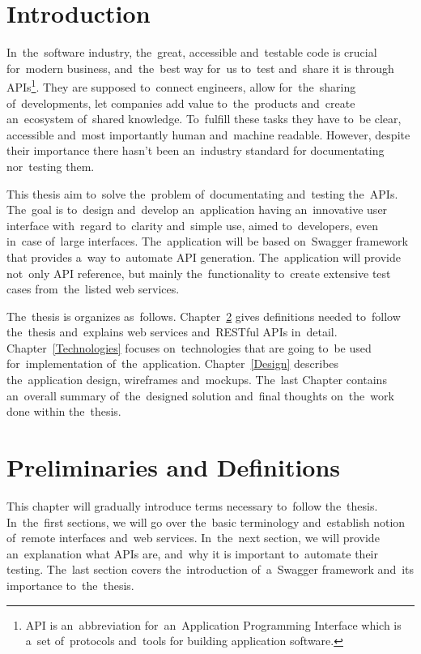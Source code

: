 

\chapter{Introduction}
In~the~software industry, the~great, accessible and~testable code is crucial
for~modern business, and~the~best way for~us to~test and~share it is
through APIs\footnote{API is an~abbreviation for~an~Application Programming
Interface which is a~set of~protocols and~tools for building application
software.}. They are supposed to~connect engineers, allow for~the~sharing
of~developments, let companies add value to~the~products and~create an~ecosystem
of~shared knowledge. To~fulfill these tasks they have to~be clear, accessible
and~most importantly human and~machine readable. However, despite their
importance there hasn't been an~industry standard for documentating nor~testing
them.

This thesis aim to~solve the~problem of~documentating and~testing the~APIs.
The~goal is to~design and~develop an~application having an~innovative user
interface with~regard to~clarity and~simple use, aimed to~developers, even
in~case of~large interfaces. The~application will be based on~Swagger
framework that provides a~way to~automate API generation.
The~application will provide not~only API reference, but mainly
the~functionality to~create extensive test cases from~the~listed web services.


The~thesis is organizes as~follows. Chapter~\ref{Preliminaries} gives
definitions needed to~follow the~thesis and~explains web services
and~RESTful APIs in~detail. Chapter~\ref{Technologies} focuses on~technologies
that are going to~be used for~implementation of~the~application. Chapter~\ref{Design}
describes the~application design, wireframes and~mockups.
The~last Chapter contains an~overall summary of~the~designed solution and~final
thoughts on~the~work done within the~thesis.




\chapter{Preliminaries and Definitions}
\label{Preliminaries}
This chapter will gradually introduce terms necessary to~follow the~thesis.
In~the~first sections, we will go over the~basic terminology and~establish
notion of~remote interfaces and~web services. In~the~next section, we will
provide an~explanation what APIs are, and~why it is important to~automate their
testing. The~last section covers the~introduction of~a~Swagger framework \cite{Swagger} 
and~its importance to~the~thesis.

